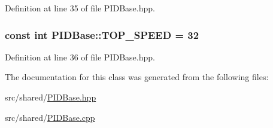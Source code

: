 Definition at line 35 of file P\-I\-D\-Base.\-hpp.

\hypertarget{classPIDBase_a42e66aae0ea7d5a54bffc062cc3ebf2b}{
\subsubsection[{T\-O\-P\-\_\-\-S\-P\-E\-E\-D}]{\setlength{\rightskip}{0pt plus 5cm}const int P\-I\-D\-Base\-::\-T\-O\-P\-\_\-\-S\-P\-E\-E\-D = 32\hspace{0.3cm}{\ttfamily [private]}}}\label{classPIDBase_a42e66aae0ea7d5a54bffc062cc3ebf2b}


Definition at line 36 of file P\-I\-D\-Base.\-hpp.



The documentation for this class was generated from the following files\-:\begin{DoxyCompactItemize}
\item 
src/shared/\hyperlink{PIDBase_8hpp}{P\-I\-D\-Base.\-hpp}\item 
src/shared/\hyperlink{PIDBase_8cpp}{P\-I\-D\-Base.\-cpp}\end{DoxyCompactItemize}
